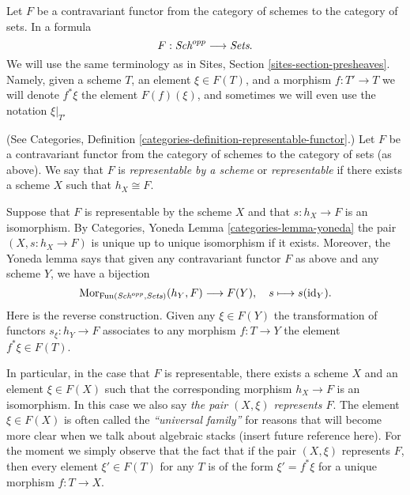 \medskip\noindent
Let $F$ be a contravariant functor from the category
of schemes to the category of sets. In a formula
$$
F : \textit{Sch}^{opp}
\longrightarrow
\textit{Sets}.
$$
We will use the same terminology as in Sites, Section
\ref{sites-section-presheaves}. Namely, given a scheme
$T$, an element $\xi \in F(T)$, and a morphism $f : T' \to T$
we will denote $f^*\xi$ the element $F(f)(\xi)$, and sometimes
we will even use the notation $\xi|_{T'}$

\begin{definition}
\label{definition-representable-functor}
(See Categories, Definition \ref{categories-definition-representable-functor}.)
Let $F$ be a contravariant functor from the category
of schemes to the category of sets (as above).
We say that $F$ is {\it representable by a scheme}
or {\it representable} if there exists a scheme $X$
such that $h_X \cong F$.
\end{definition}

\noindent
Suppose that $F$ is representable by the scheme $X$ and that
$s : h_X \to F$ is an isomorphism.
By Categories, Yoneda Lemma \ref{categories-lemma-yoneda}
the pair $(X, s : h_X \to F)$ is unique up to unique
isomorphism if it exists.
Moreover, the Yoneda lemma says that
given any contravariant functor $F$ as above
and any scheme $Y$, we have a bijection
$$
\mathop{\rm Mor}\nolimits_{\text{Fun}(\textit{Sch}^{opp}, \textit{Sets})} (h_Y, F)
\longrightarrow
F(Y), \quad
s \longmapsto s(\text{id}_Y).
$$
Here is the reverse construction. Given any $\xi \in F(Y)$
the transformation of functors $s_\xi : h_Y \to F$
associates to any morphism $f : T \to Y$ the
element $f^*\xi \in F(T)$.

\medskip\noindent
In particular, in the case that $F$ is representable, there exists
a scheme $X$ and an element $\xi \in F(X)$ such that the corresponding
morphism $h_X \to F$ is an isomorphism.
In this case we also say {\it the pair $(X, \xi)$ represents $F$}.
The element $\xi \in F(X)$
is often called the {\it ``universal family''} for reasons that will become
more clear when we talk about algebraic stacks (insert future reference here).
For the moment we simply observe that the fact that if the pair $(X, \xi)$
represents $F$, then every element $\xi' \in F(T)$ for any $T$ is of
the form $\xi' = f^*\xi$ for a unique morphism $f : T \to X$.

